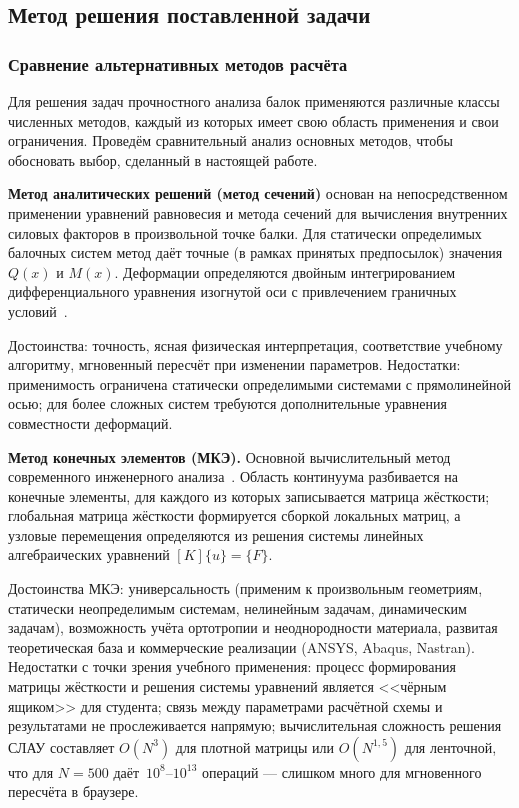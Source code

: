 ﻿%
\subsection{Метод решения поставленной задачи}

\subsubsection{Сравнение альтернативных методов расчёта}

Для решения задач прочностного анализа балок применяются различные классы численных методов, каждый из которых имеет свою область применения и свои ограничения. Проведём сравнительный анализ основных методов, чтобы обосновать выбор, сделанный в настоящей работе.

\textbf{Метод аналитических решений (метод сечений)} основан на непосредственном применении уравнений равновесия и метода сечений для вычисления внутренних силовых факторов в произвольной точке балки. Для статически определимых балочных систем метод даёт точные (в рамках принятых предпосылок) значения $Q(x)$ и $M(x)$. Деформации определяются двойным интегрированием дифференциального уравнения изогнутой оси с привлечением граничных условий~\cite{feodosev, aleksandrov}.

Достоинства: точность, ясная физическая интерпретация, соответствие учебному алгоритму, мгновенный пересчёт при изменении параметров. Недостатки: применимость ограничена статически определимыми системами с прямолинейной осью; для более сложных систем требуются дополнительные уравнения совместности деформаций.

\textbf{Метод конечных элементов (МКЭ).} Основной вычислительный метод современного инженерного анализа~\cite{zenkevich, zienkiewicz2013}. Область континуума разбивается на конечные элементы, для каждого из которых записывается матрица жёсткости; глобальная матрица жёсткости формируется сборкой локальных матриц, а узловые перемещения определяются из решения системы линейных алгебраических уравнений $[K]\{u\} = \{F\}$.

Достоинства МКЭ: универсальность (применим к произвольным геометриям, статически неопределимым системам, нелинейным задачам, динамическим задачам), возможность учёта ортотропии и неоднородности материала, развитая теоретическая база и коммерческие реализации (ANSYS, Abaqus, Nastran). Недостатки с точки зрения учебного применения: процесс формирования матрицы жёсткости и решения системы уравнений является <<чёрным ящиком>> для студента; связь между параметрами расчётной схемы и результатами не прослеживается напрямую; вычислительная сложность решения СЛАУ составляет $O(N^3)$ для плотной матрицы или $O(N^{1{,}5})$ для ленточной, что для $N = 500$ даёт~$10^8$--$10^{13}$ операций --- слишком много для мгновенного пересчёта в браузере.

